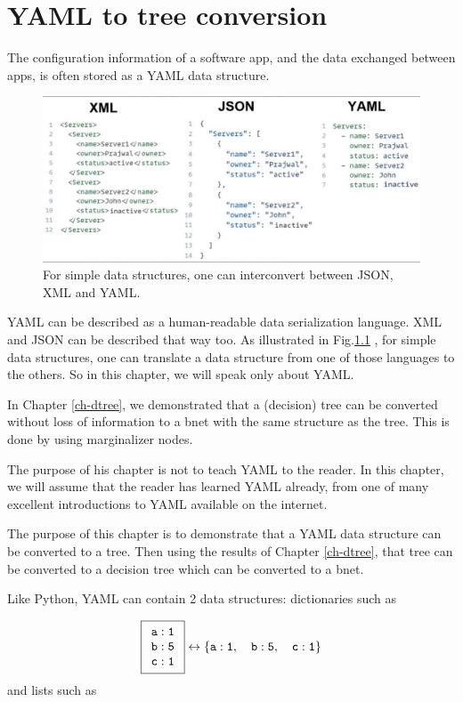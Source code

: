 \chapter{  YAML to tree conversion}


The configuration information of a software app, and the data exchanged between apps,  is often stored as a  YAML data structure.

\begin{figure}[h!]
\centering
\includegraphics[width=6in]
{yaml/json-xml-yaml.jpg}
\caption{For simple data structures,
one can interconvert between JSON, XML and YAML.}
\label{fig-json-xml-yaml}
\end{figure}

YAML can be described as a human-readable data serialization language.
XML and JSON can be described that way too.
As illustrated in Fig.\ref{fig-json-xml-yaml} , for simple data structures, one can translate a data structure
from one of those languages to the others. So in this chapter, we will speak only about YAML.


In Chapter \ref{ch-dtree},
we demonstrated that a (decision) tree
can be converted without loss of
information to a bnet with the
same structure as the tree.
This is done by using marginalizer nodes.

The purpose of his chapter is not to teach
YAML to the reader.
In this chapter, we will
assume that the reader has learned YAML already,
from one of many excellent introductions to YAML
available on the internet.


The purpose of this chapter is to
demonstrate that a YAML data structure can be converted to
a tree. Then using
the results of Chapter \ref{ch-dtree}, that tree can be converted to a decision tree which can be converted to a bnet.

Like Python, YAML 
can contain 2 data structures: dictionaries
such as 

$$\boxed{\begin{array}{l}
\tt{a:1}\\
\tt{b:5}\\
\tt{c:1}
\end{array}}
\leftrightarrow
\tt{\{a:1,\quad b:5,\quad c:1\}} 
$$
and lists such as

